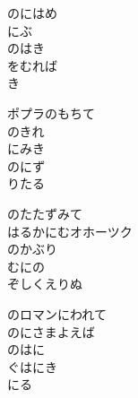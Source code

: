 \documentclass[10pt,b5j]{tarticle} %
\begin{document}
\vspace{1.5em} %
\newcommand{\linespace}{0.5em} %
\newcommand{\blocksize}{0.5\hsize} %
\begin{enumerate} %
    \begin{minipage}[c]{\blocksize}
    
        \vspace{\linespace}
        \item
        のにはめ\\
        にぶ\\
        のはき\\
        をむれば\\
        き
        
        \vspace{\linespace}
        \item
        ポプラのもちて\\
        のきれ\\
        にみき\\
        のにず\\
        りたる
        
        \vspace{\linespace}
        \item
        のたたずみて\\
        はるかにむオホーツク\\
        のかぶり\\
        むにの\\
        ぞしくえりぬ
        
        \vspace{\linespace}
        \item
        のロマンにわれて\\
        のにさまよえば\\
        のはに\\
        ぐはにき\\
        にる
        

\end{minipage}
\end{enumerate}
\end{document}
